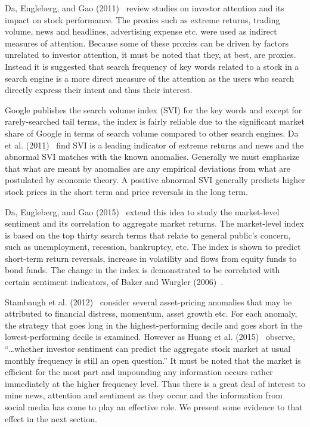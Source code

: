 Da, Engleberg, and Gao (2011)~\cite{da2011search} review studies on investor attention and its impact on stock performance. The proxies such as extreme returns, trading volume, news and headlines, advertising expense etc. were used as indirect measures of attention. Because some of these proxies can be driven by factors unrelated to investor attention, it must be noted that they, at best, are proxies. Instead it is suggested that search frequency of key words related to a stock in a search engine is a more direct measure of the attention as the users who search directly express their intent and thus their interest.


Google publishes the search volume index (SVI) for the key words and except for rarely-searched tail terms, the index is fairly reliable due to the significant market share of Google in terms of search volume compared to other search engines. Da et al. (2011)~\cite{da2011search} find SVI is a leading indicator of extreme returns and news and the abnormal SVI matches with the known anomalies. Generally we must emphasize that what are meant by anomalies are any empirical deviations from what are postulated by economic theory. A positive abnormal SVI generally predicts higher stock prices in the short term and price reversals in the long term.


Da, Engleberg, and Gao (2015)~\cite{da2015sum} extend this idea to study the market-level sentiment and its correlation to aggregate market returns. The market-level index is based on the top thirty search terms that relate to general public's concern, such as unemployment, recession, bankruptcy, etc. The index is shown to predict short-term return reversals, increase in volatility and flows from equity funds to bond funds. The change in the index is demonstrated to be correlated with certain sentiment indicators, of Baker and Wurgler (2006)~\cite{baker2006investor}.


Stambaugh et al. (2012)~\cite{stamb} consider several asset-pricing anomalies that may be attributed to financial distress, momentum, asset growth etc. For each anomaly, the strategy that goes long in the highest-performing decile and goes short in the lowest-performing decile is examined. However as Huang et al. (2015)~\cite{huang} observe, ``\dots whether investor sentiment can predict the aggregate stock market at usual monthly frequency is still an open question.'' It must be noted that the market is efficient for the most part and impounding any information occurs rather immediately at the higher frequency level. Thus there is a great deal of interest to mine news, attention and sentiment as they occur and the information from social media has come to play an effective role. We present some evidence to that effect in the next section. 


